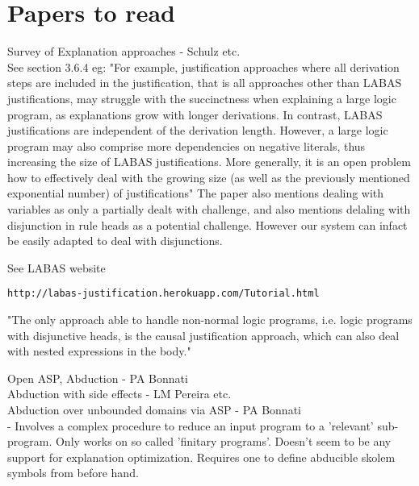 \documentclass{article}
\begin{document}
\section{Papers to read}
Survey of Explanation approaches - Schulz etc.\\ 
\newline
See section 3.6.4 eg: "For example, justification approaches where all derivation steps are included in the
justification, that is all approaches other than LABAS justifications, may struggle
with the succinctness when explaining a large logic program, as explanations grow
with longer derivations. In contrast, LABAS justifications are independent of the
derivation length. However, a large logic program may also comprise more dependencies on negative literals, thus increasing the size of LABAS justifications. More
generally, it is an open problem how to effectively deal with the growing size (as
well as the previously mentioned exponential number) of justifications" The paper also mentions dealing with variables as only a partially dealt with challenge, and also mentions delaling with disjunction in rule heads as a potential challenge. However our system can infact be easily adapted to deal with disjunctions. 

See LABAS website
\begin{verbatim}
http://labas-justification.herokuapp.com/Tutorial.html    
\end{verbatim}
"The only approach able to handle non-normal
logic programs, i.e. logic programs with disjunctive heads, is the causal justification
approach, which can also deal with nested expressions in the body."

Open ASP, Abduction - PA Bonnati\\
Abduction with side effects - LM Pereira etc.\\
Abduction over unbounded domains via ASP - PA Bonnati\\ - Involves a complex procedure to reduce an input program to a 'relevant' sub-program. Only works on so called 'finitary programs'. Doesn't seem to be any support for explanation optimization. Requires one to define abducible skolem symbols from before hand.
\end{document}
